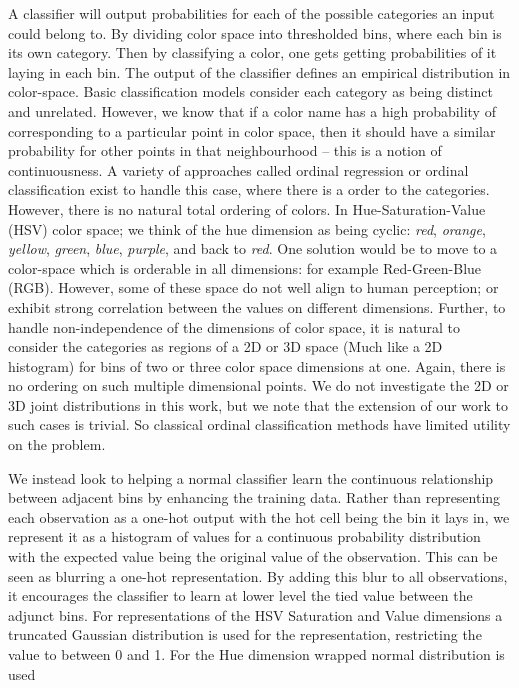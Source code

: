 \documentclass[11pt,letterpaper]{article}
\begin{document}
A classifier will output probabilities for each of the possible categories an input could belong to.
By dividing color space into thresholded bins, where each bin is its own category.
Then by classifying a color, one gets getting probabilities of it laying in each bin. The output of the classifier defines an empirical distribution in color-space.
Basic classification models consider each category as being distinct and unrelated.
However, we know that if a color name has a high probability of corresponding to a particular point in color space, then it should have a similar probability for other points in that neighbourhood -- this is a notion of continuousness.
A variety of approaches called ordinal regression or ordinal classification exist to handle this case, where there is a order to the categories.
However, there is no natural total ordering of colors.
In Hue-Saturation-Value (HSV) color space; we think of the hue dimension as being cyclic: \emph{red}, \emph{orange}, \emph{yellow}, \emph{green}, \emph{blue}, \emph{purple}, and back to \emph{red}.
One solution would be to move to a color-space which is orderable in all dimensions: for example Red-Green-Blue (RGB).
However, some of these space do not well align to human perception; or exhibit strong correlation between the values on different dimensions.
Further, to handle non-independence of the dimensions of color space, it is natural to consider the categories as regions of a 2D or 3D space (Much like a 2D histogram) for bins of two or three color space dimensions at one.
Again, there is no ordering on such multiple dimensional points.
We do not investigate the 2D or 3D joint distributions in this work, but we note that the extension of our work to such cases is trivial.
So classical ordinal classification methods have limited utility on the problem.

We instead look to helping a normal classifier learn the continuous relationship between adjacent bins by enhancing the training data.
Rather than representing each observation as a one-hot output with the hot cell being the bin it lays in, we represent it as a histogram of values for a continuous probability distribution with the expected value being the original value of the observation.
This can be seen as blurring a one-hot representation.
By adding this blur to all observations, it encourages the classifier to learn at lower level the tied value between the adjunct bins.
For representations of the HSV Saturation and Value dimensions a truncated Gaussian distribution is used for the representation, restricting the value to between 0 and 1.
For the Hue dimension wrapped normal distribution is used
\end{document}

